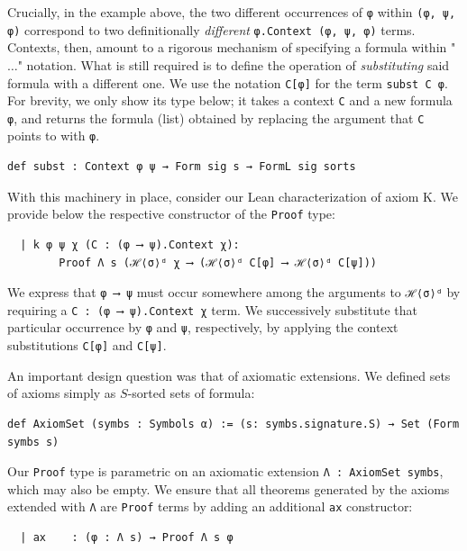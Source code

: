 \documentclass{easychair}
\theoremstyle{remark}
\begin{document}
\noindent Crucially, in the example above, the two different occurrences of \lstinline{φ} within \lstinline{(φ, ψ, φ)} correspond to two definitionally \textit{different} \lstinline{φ.Context (φ, ψ, φ)} terms.
Contexts, then, amount to a rigorous mechanism of specifying a formula within "$\dots$" notation. What is still required is to define the operation of \textit{substituting} said formula with a different one. We use the notation \lstinline{C[φ]} for the term \lstinline{subst C φ}. For brevity, we only show its type below; it takes a context \lstinline|C| and a new formula \lstinline|φ|, and returns the formula (list) obtained by replacing the argument that \lstinline|C| points to with \lstinline|φ|.

\begin{lstlisting}
def subst : Context φ ψ → Form sig s → FormL sig sorts
\end{lstlisting}

With this machinery in place, consider our Lean characterization of axiom K. We provide below the respective constructor of the \lstinline|Proof| type:
\begin{lstlisting}
  | k φ ψ χ (C : (φ ⟶ ψ).Context χ):
        Proof Λ s (ℋ⟨σ⟩ᵈ χ ⟶ (ℋ⟨σ⟩ᵈ C[φ] ⟶ ℋ⟨σ⟩ᵈ C[ψ]))
\end{lstlisting}

We express that \lstinline|φ ⟶ ψ| must occur somewhere among the arguments to \lstinline|ℋ⟨σ⟩ᵈ| by requiring a \lstinline|C : (φ ⟶ ψ).Context χ| term. We successively substitute that particular occurrence by \lstinline{φ} and \lstinline{ψ}, respectively, by applying the context substitutions \lstinline{C[φ]} and \lstinline{C[ψ]}.

\label{extensions}
An important design question was that of axiomatic extensions. We defined sets of axioms simply as $S$-sorted sets of formula:

\begin{lstlisting}
def AxiomSet (symbs : Symbols α) := (s: symbs.signature.S) → Set (Form symbs s)
\end{lstlisting}

Our \lstinline|Proof| type is parametric on an axiomatic extension \lstinline|Λ : AxiomSet symbs|, which may also be empty. We ensure that all theorems generated by the axioms extended with \lstinline|Λ| are \lstinline|Proof| terms by adding an additional \lstinline|ax| constructor:

\begin{lstlisting}
  | ax    : (φ : Λ s) → Proof Λ s φ
\end{lstlisting}
\end{document}
